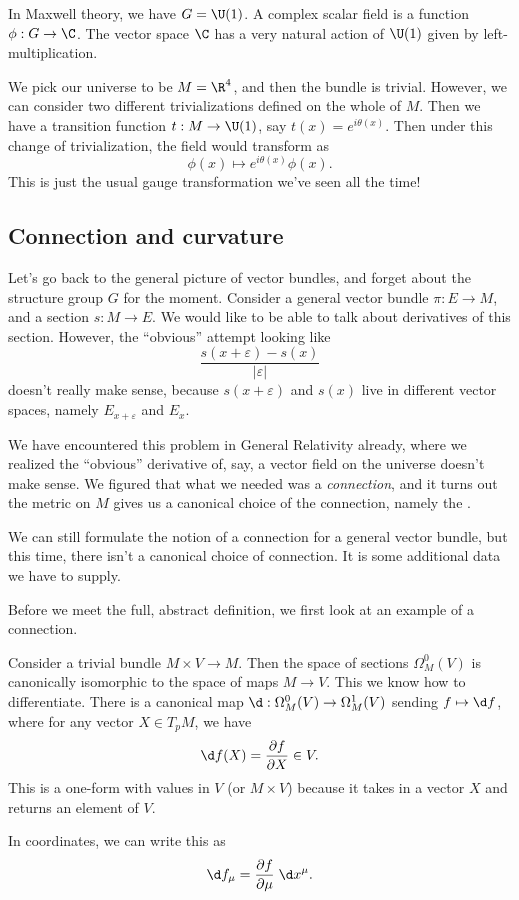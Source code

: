 \documentclass[a4paper]{article}
\begin{document}
\begin{eg}
  In Maxwell theory, we have $G = \U(1)$. A complex scalar field is a function $\phi: G \to \C$. The vector space $\C$ has a very natural action of $\U(1)$ given by left-multiplication.

  We pick our universe to be $M = \R^4$, and then the bundle is trivial. However, we can consider two different trivializations defined on the whole of $M$. Then we have a transition function $t: M \to \U(1)$, say $t(x) = e^{i \theta(x)}$. Then under this change of trivialization, the field would transform as
  \[
    \phi(x) \mapsto e^{i\theta(x)} \phi(x).
  \]
  This is just the usual gauge transformation we've seen all the time!
\end{eg}

\subsection{Connection and curvature}
Let's go back to the general picture of vector bundles, and forget about the structure group $G$ for the moment. Consider a general vector bundle $\pi: E \to M$, and a section $s: M \to E$. We would like to be able to talk about derivatives of this section. However, the ``obvious'' attempt looking like
\[
  \frac{s(x + \varepsilon) - s(x)}{|\varepsilon|}
\]
doesn't really make sense, because $s(x + \varepsilon)$ and $s(x)$ live in different vector spaces, namely $E_{x + \varepsilon}$ and $E_x$.

We have encountered this problem in General Relativity already, where we realized the ``obvious'' derivative of, say, a vector field on the universe doesn't make sense. We figured that what we needed was a \emph{connection}, and it turns out the metric on $M$ gives us a canonical choice of the connection, namely the .

We can still formulate the notion of a connection for a general vector bundle, but this time, there isn't a canonical choice of connection. It is some additional data we have to supply.

Before we meet the full, abstract definition, we first look at an example of a connection.
\begin{eg}
  Consider a trivial bundle $M \times V \to M$. Then the space of sections $\Omega^0_M(V)$ is canonically isomorphic to the space of maps $M \to V$. This we know how to differentiate. There is a canonical map $\d: \Omega^0_M(V) \to \Omega^1_M(V)$ sending $f \mapsto \d f$, where for any vector $X \in T_p M$, we have
  \[
    \d f(X) = \frac{\partial f}{\partial X} \in V.
  \]
  This is a one-form with values in $V$ (or $M \times V$) because it takes in a vector $X$ and returns an element of $V$.

  In coordinates, we can write this as
  \[
    \d f_\mu = \frac{\partial f}{\partial \mu} \;\d x^\mu.
  \]
\end{eg}
\end{document}
